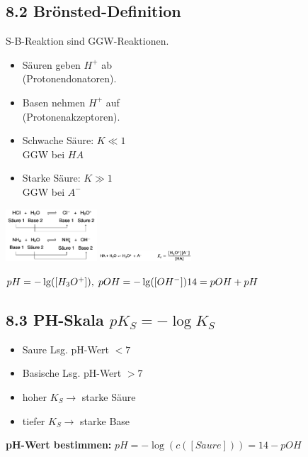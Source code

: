 \begin{multicols*}{4}
\subsection{8.2 Brönsted-Definition}{
    \begin{minipage}{34mm}
        S-B-Reaktion sind GGW-Reaktionen.
        \begin{itemize}[noitemsep,leftmargin=*]
        \item Säuren geben $H^+$ ab \\(Protonendonatoren).
        \item Basen nehmen $H^+$ auf \\(Protonenakzeptoren).
        \item Schwache Säure: $K\ll1$\\ GGW bei $HA$
        \item Starke Säure: $K\gg1$\\GGW bei $A^-$
    \end{itemize}
    \end{minipage}
    \begin{minipage}{34mm}
        \includegraphics[width=34mm]{Bilder/SaureBaseReaktion.png}
        \vspace*{1mm}
        \includegraphics[width=34mm]{Bilder/SaureBaseReaktion2.png}
    \end{minipage}
    $pH=-\lg (\left[H_3O^+\right]),\; pOH=-\lg(\left[OH^-\right])\\14=pOH+pH$
}


\subsection{8.3 PH-Skala $pK_S=-\log K_S$}{ 
    \begin{minipage}{35mm}
        \begin{itemize}[noitemsep,leftmargin=*]
            \item Saure Lsg. pH-Wert $<7$
            \item Basische Lsg. pH-Wert $>7$
    \end{itemize} 
        \end{minipage}
    \begin{minipage}{35mm}
        \begin{itemize}[noitemsep,leftmargin=*]
            \item hoher $K_S\rightarrow$ starke Säure
            \item tiefer $K_S\rightarrow$ starke Base
        \end{itemize}
\end{minipage}
\textbf{pH-Wert bestimmen:} $pH=-\log(c(\left[S\ddot{a}ure \right]))=14-pOH$
}



\end{multicols*}
